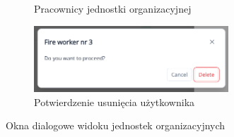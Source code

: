 \begin{figure}[H]
\begin{subfigure}[b]{0.49\textwidth}
        \caption{Pracownicy jednostki organizacyjnej}
    \end{subfigure}
    \begin{subfigure}[b]{0.7\textwidth}
        \centering
        \includegraphics[width=0.8\textwidth, frame]{graf/front/confirmWorkerDelete.png}
        \caption{Potwierdzenie usunięcia użytkownika}
    \end{subfigure}
    \caption{Okna dialogowe widoku jednostek organizacyjnych}
    \label{fig:unitDialogs}
\end{figure}

